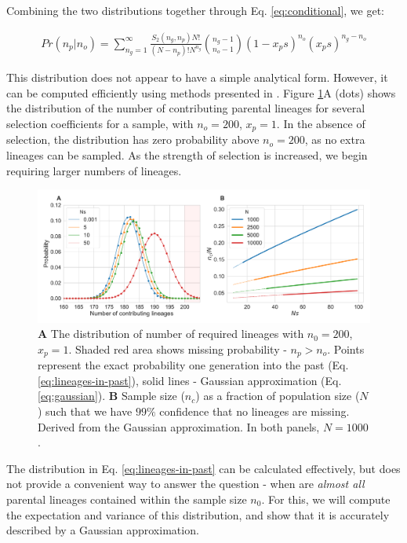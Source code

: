 \documentclass[review]{elsarticle}
\begin{document}
Combining the two distributions together through Eq. \ref{eq:conditional}, we get:

\begin{align}
  \label{eq:lineages-in-past}
   Pr(n_p|n_o) = \sum_{n_g=1}^{\infty} \frac{S_2(n_g,n_p) N!}{(N-n_p)! N^{n_g}} \binom{n_g-1}{n_o-1}(1-x_ps)^{n_o}(x_ps)^{n_g-n_o}
\end{align}

This distribution does not appear to have a simple analytical form. However, it can be computed
efficiently using methods presented in \citep{ONeill2019}. Figure \ref{fig:combined}A (dots) shows
the distribution of the number of contributing parental lineages for several selection coefficients
for a sample, with $n_o=200$, $x_p=1$. In the absence of selection, the distribution has zero
probability above $n_o=200$, as no extra lineages can be sampled. As the strength of selection is
increased, we begin requiring larger numbers of lineages.

\begin{figure}
  \centering
  \includegraphics[width=\textwidth]{fig/combined.pdf}
  \caption{\textbf{A} The distribution of number of required lineages with $n_0=200$, $x_p=1$. Shaded
    red area shows missing probability - $n_p > n_o$. Points represent the exact probability one
    generation into the past (Eq. \ref{eq:lineages-in-past}), solid lines - Gaussian approximation
    (Eq. \ref{eq:gaussian}). \textbf{B} Sample size ($n_c$) as a fraction of population size ($N$)
    such that we have $99\%$ confidence that no lineages are missing. Derived from the Gaussian
    approximation. In both panels, $N=1000$.}
  \label{fig:combined}
\end{figure}

The distribution in Eq. \ref{eq:lineages-in-past} can be calculated effectively, but does not
provide a convenient way to answer the question - when are \textit{almost all} parental lineages
contained within the sample size $n_0$. For this, we will compute the expectation and variance 
of this distribution, and show that it is accurately described by a Gaussian approximation.
\end{document}

